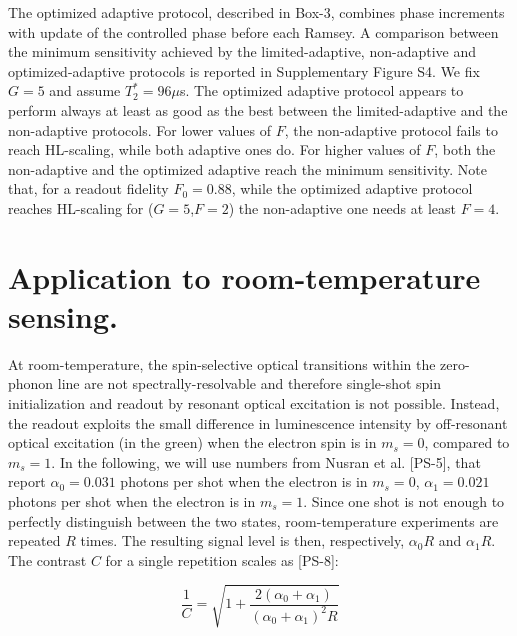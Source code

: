 \documentclass{report}
\begin{document}
The optimized adaptive protocol, described in Box-3, combines phase increments with update of the controlled phase before each Ramsey. A comparison between the minimum sensitivity achieved by the limited-adaptive, non-adaptive and optimized-adaptive protocols is reported in Supplementary Figure S4. We fix $G=5$ and assume $T_2^* = 96 \mu$s. 
The optimized adaptive protocol appears to perform always at least as good as the best between the limited-adaptive and the non-adaptive protocols. For lower values of $F$, the non-adaptive protocol fails to reach HL-scaling, while both adaptive ones do. For higher values of $F$, both the non-adaptive and the optimized adaptive reach the minimum sensitivity. Note that, for a readout fidelity $F_0 = 0.88$, while the optimized adaptive protocol reaches HL-scaling for ($G = 5$,$F = 2$) the non-adaptive one needs at least $F = 4$.

\section{Application to room-temperature sensing.}
At room-temperature, the spin-selective optical transitions within the zero-phonon line are not spectrally-resolvable and therefore single-shot spin initialization and readout by resonant optical excitation is not possible. Instead, the readout exploits the small difference in luminescence intensity by off-resonant optical excitation (in the green) when the electron spin is in $m_s = 0$, compared to $m_s = 1$. In the following, we will use numbers from Nusran et al. [PS-5], that report $\alpha_0 = 0.031$ photons per shot when the electron is in $m_s = 0$, $\alpha_1 = 0.021$ photons per shot when the electron is in $m_s = 1$.  Since one shot is not enough to perfectly distinguish between the two states, room-temperature experiments are repeated $R$ times. The resulting signal level is then, respectively, $\alpha_0 R$ and $\alpha_1 R$. The contrast $C$ for a single repetition scales as [PS-8]:

\begin{equation}
\frac{1}{C} = \sqrt{1+\frac{2(\alpha_0 + \alpha_1)}{(\alpha_0+\alpha_1)^2R}}
\end{equation}
\end{document}
